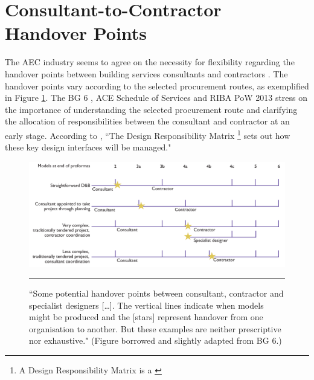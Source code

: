 
\section{Consultant-to-Contractor Handover Points}

The AEC industry seems to agree on the necessity for flexibility
regarding the handover points between building services consultants and contractors \citep{BG62014, ACE2017, CIC2007, RIBAPlan}.
The handover points vary according to the selected procurement routes, as exemplified in Figure \ref{fig_BG6_handover_pts}.
The BG 6 \citep{BG62014}, ACE Schedule of Services \citep{ACE2017} and RIBA PoW 2013 \citep{RIBAPlan} stress on the importance of understanding the selected procurement route and clarifying the allocation of responsibilities between the consultant and contractor at an early stage.
According to \cite{RIBAPlan}, ``The Design Responsibility Matrix \footnote{A Design Responsibility Matrix is a  \citep{RIBAPlan}} sets out how these key design interfaces will be managed."

\begin{figure}[htbp]
	\centering
	\includegraphics[width=\textwidth]{figures/BG6_handover_pts.png}
	\rule{\textwidth}{0.5pt} %
	\caption[Potential handover points between consultant, contractor and specialist designers.]{``Some potential handover points between consultant, contractor and specialist designers [\ldots]. The vertical lines indicate when models might be produced and the [stars] represent handover from one organisation to another. But these examples are neither prescriptive nor exhaustive." \citep[p.~2]{BG62014} (Figure borrowed and slightly adapted from BG 6.)}
	\label{fig_BG6_handover_pts}
\end{figure}


